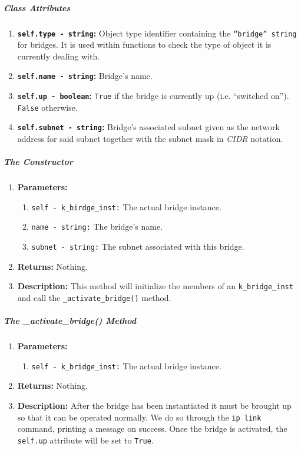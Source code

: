         \subparagraph{Class Attributes}
            \begin{enumerate}
                \item \textbf{\texttt{self.type - string}:} Object type identifier containing the \texttt{``bridge'' string} for bridges. It is used within functions to check the type of object it is currently dealing with.
                \item \textbf{\texttt{self.name - string}:} Bridge's name.
                \item \textbf{\texttt{self.up - boolean}:} \texttt{True} if the bridge is currently up (i.e. ``switched on''). \texttt{False} otherwise.
                \item \textbf{\texttt{self.subnet - string}:} Bridge's associated subnet given as the network address for said subnet together with the subnet mask in \textit{CIDR} notation.
            \end{enumerate}

        \subparagraph{The Constructor}
            \begin{enumerate}
                \item \textbf{Parameters:}
                \begin{enumerate}
                    \item \texttt{self - k\_birdge\_inst:} The actual bridge instance.
                    \item \texttt{name - string:} The bridge's name.
                    \item \texttt{subnet - string:} The subnet associated with this bridge.
                \end{enumerate}
                \item \textbf{Returns:} Nothing.
                \item \textbf{Description:} This method will initialize the members of an \texttt{k\_bridge\_inst} and call the \texttt{\_activate\_bridge()} method.
            \end{enumerate}

        \subparagraph{The \_activate\_bridge() Method}
            \begin{enumerate}
                \item \textbf{Parameters:}
                \begin{enumerate}
                    \item \texttt{self - k\_bridge\_inst:} The actual bridge instance.
                \end{enumerate}
                \item \textbf{Returns:} Nothing.
                \item \textbf{Description:} After the bridge has been instantiated it must be brought up so that it can be operated normally. We do so through the \texttt{ip link} command, printing a message on success. Once the bridge is activated, the \texttt{self.up} attribute will be set to \texttt{True}.
            \end{enumerate}

